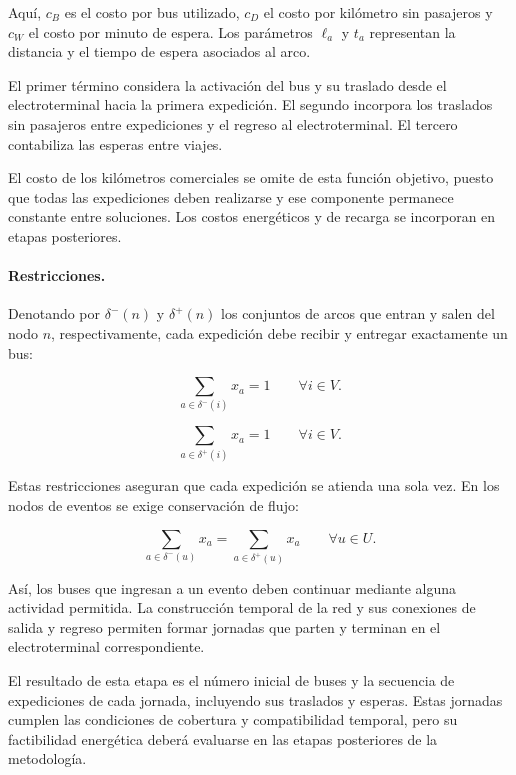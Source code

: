 Aquí, $c_B$ es el costo por bus utilizado, $c_D$ el costo por kilómetro
sin pasajeros y $c_W$ el costo por minuto de espera. Los parámetros $\ell_a$
y $t_a$ representan la distancia y el tiempo de espera asociados al arco.

El primer término considera la activación del bus y su traslado desde
el electroterminal hacia la primera expedición. El segundo incorpora
los traslados sin pasajeros entre expediciones y el regreso al electroterminal.
El tercero contabiliza las esperas entre viajes.

El costo de los kilómetros comerciales se omite de esta función objetivo,
puesto que todas las expediciones deben realizarse y ese componente
permanece constante entre soluciones. Los costos energéticos y de recarga
se incorporan en etapas posteriores.

\paragraph{Restricciones.}

Denotando por $\delta^{-}(n)$ y $\delta^{+}(n)$ los conjuntos de arcos
que entran y salen del nodo $n$, respectivamente, cada expedición debe
recibir y entregar exactamente un bus:

\begin{equation}
    \sum_{a \in \delta^{-}(i)} x_a = 1
    \qquad \forall i \in V.
    \label{eq:cobertura-in}
\end{equation}

\begin{equation}
    \sum_{a \in \delta^{+}(i)} x_a = 1
    \qquad \forall i \in V.
    \label{eq:cobertura-out}
\end{equation}

Estas restricciones aseguran que cada expedición se atienda una sola vez.
En los nodos de eventos se exige conservación de flujo:

\begin{equation}
    \sum_{a \in \delta^{-}(u)} x_a
    =
    \sum_{a \in \delta^{+}(u)} x_a
    \qquad \forall u \in U.
    \label{eq:conservacion}
\end{equation}

Así, los buses que ingresan a un evento deben continuar mediante alguna
actividad permitida. La construcción temporal de la red y sus conexiones
de salida y regreso permiten formar jornadas que parten y terminan
en el electroterminal correspondiente.

El resultado de esta etapa es el número inicial de buses y la secuencia
de expediciones de cada jornada, incluyendo sus traslados y esperas.
Estas jornadas cumplen las condiciones de cobertura y compatibilidad
temporal, pero su factibilidad energética deberá evaluarse en las
etapas posteriores de la metodología.


